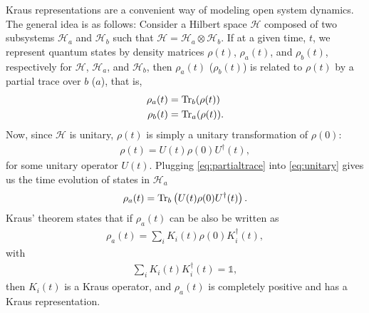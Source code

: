 Kraus representations \cite{Kraus} are a convenient way of modeling open system dynamics. The general idea is as follows: Consider a Hilbert space $\mathcal{H}$ composed of two subsystems $\mathcal{H}_a$ and $\mathcal{H}_b$ such that $\mathcal{H}=\mathcal{H}_a\otimes \mathcal{H}_b$. If at a given time, $t$, we represent quantum states by density matrices $\rho(t)$, $\rho_a(t)$, and $\rho_b(t)$, respectively for $\mathcal{H}$, $\mathcal{H}_a$, and $\mathcal{H}_b$, then $\rho_{a}(t)$ ($\rho_b(t)$) is related to $\rho(t)$ by a partial trace over $b$ ($a$), that is,
\begin{align}
\rho_a(t) &= \Tr_b(\rho(t))\nonumber \\
\label{eq:partialtrace}
\rho_b(t) &= \Tr_a(\rho(t)).
\end{align}
Now, since $\mathcal{H}$ is unitary, $\rho(t)$ is simply a unitary transformation of $\rho(0)$:
\begin{align}
\label{eq:unitary}
\rho(t) = U(t)\rho(0)U^\dagger(t),
\end{align} 
for some unitary operator $U(t)$. Plugging \ref{eq:partialtrace} into \ref{eq:unitary} gives us the time evolution of states in $\mathcal{H}_a$
\begin{align}
\rho_a(t) = \Tr_b\left(U(t)\rho(0)U^\dagger(t)\right).
\end{align}
Kraus' theorem states that if $\rho_a(t)$ can be also be written as
\begin{align}
\rho_a(t) = \sum_iK_i(t)\rho(0)K_i^\dagger(t),
\end{align}
with
\begin{align}
\sum_iK_i(t)K_i^\dagger(t)=\mathds{1},
\end{align}
then $K_i(t)$ is a Kraus operator, and $\rho_a(t)$ is completely positive and has a Kraus representation.

